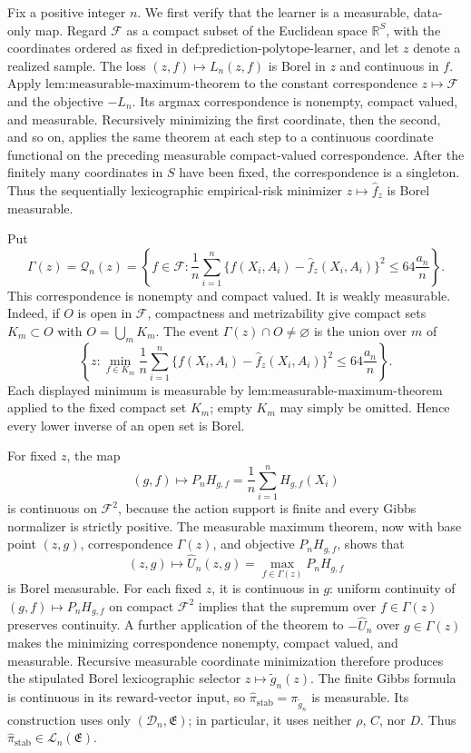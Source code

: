 Fix a positive integer \(n\). We first verify that the learner is a measurable, data-only map. Regard \(\mathcal F\) as a compact subset of the Euclidean space \(\mathbb R^S\), with the coordinates ordered as fixed in \(\text{def:prediction-polytope-learner}\), and let \(z\) denote a realized sample. The loss \((z,f)\mapsto L_n(z,f)\) is Borel in \(z\) and continuous in \(f\). Apply \(\text{lem:measurable-maximum-theorem}\) to the constant correspondence \(z\mapsto\mathcal F\) and the objective \(-L_n\). Its argmax correspondence is nonempty, compact valued, and measurable. Recursively minimizing the first coordinate, then the second, and so on, applies the same theorem at each step to a continuous coordinate functional on the preceding measurable compact-valued correspondence. After the finitely many coordinates in \(S\) have been fixed, the correspondence is a singleton. Thus the sequentially lexicographic empirical-risk minimizer \(z\mapsto\widehat f_z\) is Borel measurable.

Put
\[
\Gamma(z)=\mathcal Q_n(z)
=\left\{f\in\mathcal F:\frac1n\sum_{i=1}^n\{f(X_i,A_i)-\widehat f_z(X_i,A_i)\}^2\le64\frac{a_n}{n}\right\}.
\]
This correspondence is nonempty and compact valued. It is weakly measurable. Indeed, if \(O\) is open in \(\mathcal F\), compactness and metrizability give compact sets \(K_m\subset O\) with \(O=\bigcup_mK_m\). The event \(\Gamma(z)\cap O\ne\varnothing\) is the union over \(m\) of
\[
\left\{z:\min_{f\in K_m}\frac1n\sum_{i=1}^n\{f(X_i,A_i)-\widehat f_z(X_i,A_i)\}^2\le64\frac{a_n}{n}\right\}.
\]
Each displayed minimum is measurable by \(\text{lem:measurable-maximum-theorem}\) applied to the fixed compact set \(K_m\); empty \(K_m\) may simply be omitted. Hence every lower inverse of an open set is Borel.

For fixed \(z\), the map
\[
(g,f)\longmapsto P_nH_{g,f}=\frac1n\sum_{i=1}^nH_{g,f}(X_i)
\]
is continuous on \(\mathcal F^2\), because the action support is finite and every Gibbs normalizer is strictly positive. The measurable maximum theorem, now with base point \((z,g)\), correspondence \(\Gamma(z)\), and objective \(P_nH_{g,f}\), shows that
\[
(z,g)\longmapsto\widehat U_n(z,g)=\max_{f\in\Gamma(z)}P_nH_{g,f}
\]
is Borel measurable. For each fixed \(z\), it is continuous in \(g\): uniform continuity of \((g,f)\mapsto P_nH_{g,f}\) on compact \(\mathcal F^2\) implies that the supremum over \(f\in\Gamma(z)\) preserves continuity. A further application of the theorem to \(-\widehat U_n\) over \(g\in\Gamma(z)\) makes the minimizing correspondence nonempty, compact valued, and measurable. Recursive measurable coordinate minimization therefore produces the stipulated Borel lexicographic selector \(z\mapsto\widetilde g_n(z)\). The finite Gibbs formula is continuous in its reward-vector input, so \(\widehat\pi_{\mathrm{stab}}=\pi_{\widetilde g_n}\) is measurable. Its construction uses only \((\mathcal D_n,\mathfrak E)\); in particular, it uses neither \(\rho\), \(C\), nor \(D\). Thus \(\widehat\pi_{\mathrm{stab}}\in\mathcal L_n(\mathfrak E)\).

